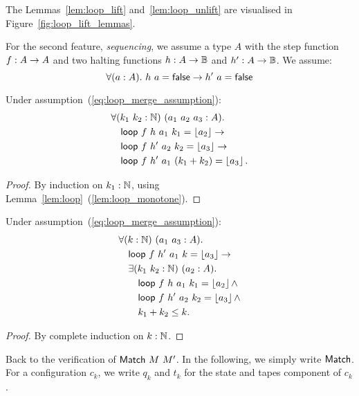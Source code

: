 The Lemmas~\ref{lem:loop_lift} and~\ref{lem:loop_unlift} are visualised in Figure~\ref{fig:loop_lift_lemmas}.

For the second feature, \emph{sequencing}, we assume a type $A$ with the step function $f : A \rightarrow A$ and two halting functions
$h : A \rightarrow \mathbb{B}$ and $h' : A \rightarrow \mathbb{B}$.  We assume:
\begin{equation}
  \label{eq:loop_merge_assumption}
  \forall(a:A).~h~a = \mathsf{false} \rightarrow h'~a = \mathsf{false}
\end{equation}

\begin{lemma}
  \label{lem:loop_merge}
  Under assumption~(\ref{eq:loop_merge_assumption}):
  \begin{align*}
    & \forall (k_1~k_2:\mathbb{N})~(a_1~a_2~a_3 : A).\\
    & \quad \mathsf{loop}~f~h ~a_1~k_1       = \left\lfloor {a_2} \right\rfloor \rightarrow\\
    & \quad \mathsf{loop}~f~h'~a_2~k_2       = \left\lfloor {a_3} \right\rfloor \rightarrow\\
    & \quad \mathsf{loop}~f~h'~a_1~(k_1+k_2) = \left\lfloor {a_3} \right\rfloor.
  \end{align*}
\end{lemma}
\begin{proof}
  By induction on $k_1:\mathbb{N}$, using Lemma~\ref{lem:loop}~(\ref{lem:loop_monotone}).
\end{proof}
\begin{lemma}
  \label{lem:loop_split}
  Under assumption~(\ref{eq:loop_merge_assumption}):
  \begin{align*}
    & \forall (k:\mathbb{N})~(a_1~a_3 : A).\\
    & \quad \mathsf{loop}~f~h'~a_1~k = \left\lfloor {a_3} \right\rfloor \rightarrow \\
    & \quad \exists (k_1~k_2:\mathbb{N})~(a_2:A).\\
    & \quad \quad \mathsf{loop}~f~h ~a_1~k_1 = \left\lfloor {a_2} \right\rfloor \land\\
    & \quad \quad \mathsf{loop}~f~h'~a_2~k_2 = \left\lfloor {a_3} \right\rfloor \land\\
    & \quad \quad k_1 + k_2 \leq k.
  \end{align*}
\end{lemma}
\begin{proof}
  By complete induction on $k:\mathbb{N}$.
\end{proof}


Back to the verification of $\mathsf{Match}~M~M'$.  In the following, we simply write $\mathsf{Match}$.  For a configuration $c_k$, we write $q_k$ and $t_k$ for the
state and tapes component of $c_k$.

